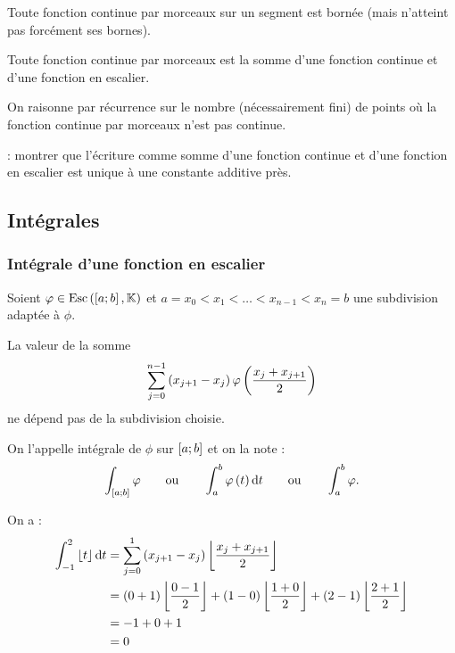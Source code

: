 \begin{rem}
Toute fonction continue par morceaux sur un segment est bornée (mais n'atteint pas forcément ses bornes).
\end{rem}

\begin{rem}
Toute fonction continue par morceaux est la somme d'une fonction continue et d'une fonction en escalier.
\end{rem}

\begin{dem}
On raisonne par récurrence sur le nombre (nécessairement fini) de points où la fonction continue par morceaux n'est pas continue.

 : montrer que l'écriture comme somme d'une fonction continue et d'une fonction en escalier est unique à une constante additive près.
\end{dem}

\subsection{Intégrales}

\subsubsection{Intégrale d'une fonction en escalier}

\begin{defi}
Soient \(\phi\in\Esc\) et \(a=x_0<x_1<\dots<x_{n-1}<x_n=b\) une subdivision adaptée à \(\phi\).

La valeur de la somme \[\sum_{j=0}^{n-1}\left(x_{j+1}-x_j\right)\varphi\left(\dfrac{x_j+x_{j+1}}{2}\right)\] ne dépend pas de la subdivision choisie.

On l'appelle intégrale de \(\phi\) sur \(\left[a;b\right]\) et on la note : \[\int_{\intervii{a}{b}}\phi\qquad\text{ou}\qquad\int_a^b\phi\paren{t}\odif{t}\qquad\text{ou}\qquad\int_a^b\phi.\]
\end{defi}

\begin{ex}
On a : \[\begin{aligned}
\int_{-1}^2\floor{t}\odif{t}&=\sum_{j=0}^1\paren{x_{j+1}-x_j}\floor{\dfrac{x_j+x_{j+1}}{2}} \\
&=\paren{0+1}\floor{\dfrac{0-1}{2}}+\paren{1-0}\floor{\dfrac{1+0}{2}}+\paren{2-1}\floor{\dfrac{2+1}{2}} \\
&=-1+0+1 \\
&=0
\end{aligned}\]
\end{ex}


